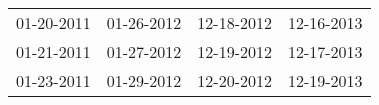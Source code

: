 \begin{supertabular}{llll}
 01-20-2011 &  01-26-2012 &  12-18-2012 &  12-16-2013 \\
 01-21-2011 &  01-27-2012 &  12-19-2012 &  12-17-2013 \\
 01-23-2011 &  01-29-2012 &  12-20-2012 &  12-19-2013 \\
\end{supertabular}
